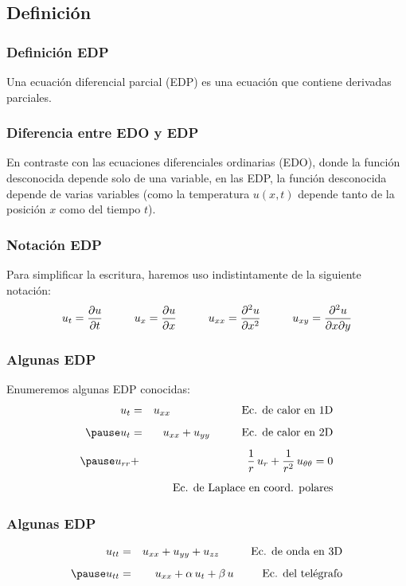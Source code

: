\documentclass[12pt]{beamer}
\begin{document}
\subsection{Definición}

\begin{frame}
\frametitle{Definición EDP}
Una ecuación diferencial parcial (EDP) es una ecuación que contiene derivadas parciales. 
\end{frame}
\begin{frame}
\frametitle{Diferencia entre EDO y EDP}    
En contraste con las ecuaciones diferenciales ordinarias (EDO), donde la función desconocida depende solo de una variable, en las EDP, la función desconocida depende de varias variables (como la temperatura $u (x, t)$ depende tanto de la posición $x$ como del tiempo $t$).
\end{frame}
\begin{frame}
\frametitle{Notación EDP}
Para simplificar la escritura, haremos uso indistintamente de la siguiente notación:
\begin{align*}
u_{t} = \pdv{u}{t} \hspace{1cm} u_{x} = \pdv{u}{x} \hspace{1cm} u_{xx} = \pdv[2]{u}{x} \hspace{1cm} u_{xy} = \pdv[2]{u}{x}{y}
\end{align*}
\end{frame}
\begin{frame}
\frametitle{Algunas EDP}
Enumeremos algunas EDP conocidas:
\begin{eqnarray*}
u_{t} &=& u_{xx} \hspace{2.25cm} \mbox{Ec. de calor en 1D} \\[0.5em] \pause
u_{t} &=& u_{xx} + u_{yy} \hspace{1cm} \mbox{Ec. de calor en 2D} \\[0.5em] \pause
u_{rr} &+& \dfrac{1}{r} \, u_{r} + \dfrac{1}{r^{2}} \, u_{\theta \theta} = 0 \\[0.5em]
&{}& \mbox{Ec. de Laplace en coord. polares}
\end{eqnarray*}
\end{frame}
\begin{frame}
\frametitle{Algunas EDP}
\begin{eqnarray*}
u_{tt} &=& u_{xx} + u_{yy} + u_{zz} \hspace{1cm} \mbox{Ec. de onda en 3D} \\[0.5em] \pause
u_{tt} &=& u_{xx} + \alpha \, u_{t} + \beta \, u \hspace{0.9cm} \mbox{Ec. del telégrafo}
\end{eqnarray*}
\end{frame}
\end{document}
